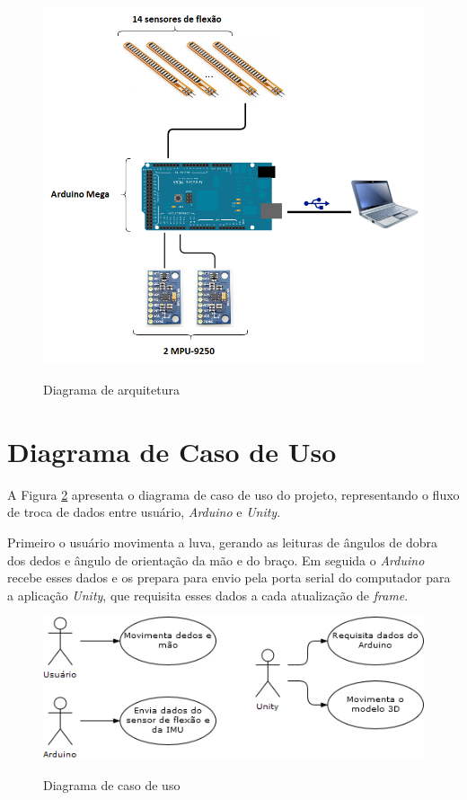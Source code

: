 \begin{figure}[H]
  \setlength{\abovecaptionskip}{0pt}
  \setlength{\belowcaptionskip}{0pt}
  \caption[Diagrama de arquitetura]{Diagrama de arquitetura}
  \centering
  \includegraphics[width=.7\textwidth]{imagem/arquitetura}
  \captionsetup{justification=centering}
  \label{fig:arq}
\end{figure}

\section{Diagrama de Caso de Uso}
\label{sec:caso_de_uso}
A Figura \ref{fig:uml} apresenta o diagrama de caso de uso do projeto, representando o fluxo de troca de dados entre usuário, \textit{Arduino} e \textit{Unity}.

Primeiro o usuário movimenta a luva, gerando as leituras de ângulos de dobra dos dedos e ângulo de orientação da mão e do braço. Em seguida o \textit{Arduino} recebe esses dados e os prepara para envio pela porta serial do computador para a aplicação \textit{Unity}, que requisita esses dados a cada atualização de \textit{frame}.

\begin{figure}[H]
  \setlength{\abovecaptionskip}{0pt}
  \setlength{\belowcaptionskip}{0pt}
  \caption[Diagrama de caso de uso]{Diagrama de caso de uso}
  \centering
  \includegraphics[width=.7\textwidth]{imagem/Caso_de_Uso}
  \captionsetup{justification=centering}
  \label{fig:uml}
\end{figure}

